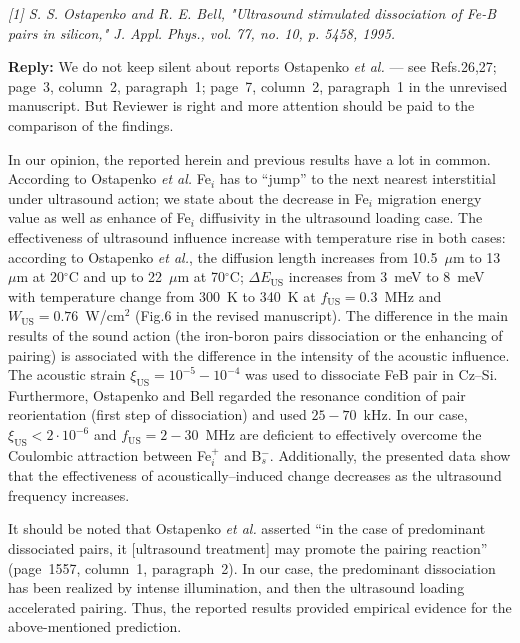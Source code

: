 \documentclass[aip,jap,preprint]{revtex4-1}
\begin{document}
\emph{
[1] S. S. Ostapenko and R. E. Bell, "Ultrasound stimulated dissociation of Fe-B pairs in silicon," J. Appl. Phys., vol. 77, no. 10, p. 5458, 1995.
 }

\noindent
\textcolor[rgb]{0.51,0.00,0.00}{\textbf{Reply:}}
We do not keep silent about reports Ostapenko \emph{et al.} --- see Refs.26,27;
page~3, column~2, paragraph~1; page~7, column~2, paragraph~1 in the unrevised manuscript.
But Reviewer is right and more attention should be paid to the comparison of the findings.

In our opinion,
the reported herein and previous results have a lot in common.
According to Ostapenko \emph{et al.}\cite{Ostapenko1995SST}
Fe$_i$ has to ``jump'' to the next nearest interstitial under ultrasound action;
we state about the decrease in Fe$_i$ migration energy value
as well as enhance of Fe$_i$ diffusivity
in the ultrasound loading case.
The effectiveness of ultrasound influence increase with temperature rise in both cases:
according to Ostapenko \emph{et al.},\cite{Ostapenko1994APL,Ostapenko1995SST}
the diffusion length increases from 10.5~$\mu$m to 13~$\mu$m at 20$^\circ$C and up to
22~$\mu$m at 70$^\circ$C;
$\Delta E_\mathrm{US}$ increases from 3~meV to 8~meV with temperature change
from 300~K to 340~K at  $f_\mathrm{US}=0.3$~MHz and $W_\mathrm{US}=0.76$~W/cm$^2$
(Fig.6 in the revised manuscript).
The difference in the main results of the sound action
(the iron-boron pairs dissociation or the enhancing of pairing)
is associated with the difference in the intensity of the acoustic influence.
The acoustic strain $\xi_\mathrm{US}=10^{-5}-10^{-4}$ was used\cite{Ostapenko1995} to
dissociate FeB pair in Cz--Si.
Furthermore,
Ostapenko and Bell\cite{Ostapenko1995} regarded the resonance condition of
pair reorientation (first step of dissociation) and used $25-70$~kHz.
In our case,  $\xi_\mathrm{US}<2\cdot10^{-6}$ and $f_\mathrm{US}=2-30$~MHz are deficient to effectively overcome the Coulombic attraction between Fe$_i^+$ and B$_s^-$.
Additionally, the presented data show that the effectiveness of acoustically--induced change
decreases as the ultrasound frequency increases.

It should be noted that Ostapenko \emph{et al.}\cite{Ostapenko1994APL} asserted
``in the  case  of predominant  dissociated  pairs,  it [ultrasound treatment] may promote  the
pairing reaction'' (page~1557, column~1, paragraph~2).
In our case, the predominant  dissociation has been realized by intense illumination, and then
the ultrasound loading accelerated pairing.
Thus, the reported results provided empirical evidence  for the above-mentioned prediction.
\end{document}
